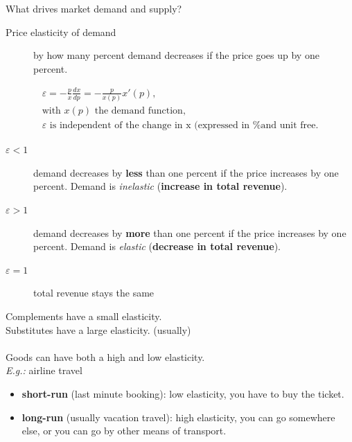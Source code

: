 \documentclass[12pt, a4paper, titlepage]{extarticle}
\begin{document}
	What drives market demand and supply?
	
	\begin{description}
		\item[Price elasticity of demand] by how many percent demand decreases if the price goes up by one percent. 
	\end{description}
	
	\begin{equation}
		\begin{gathered}
			\varepsilon = -\frac{p}{x}\frac{dx}{dp} = -\frac{p}{x(p)}x'(p), \\ \text{with $x(p)$ the demand function,} \\ \text{$\varepsilon$ is independent of the change in x (expressed in \% and unit free.}
		\end{gathered}
	\end{equation}
	
	\begin{description}
		\item[$\varepsilon < 1$] demand decreases by \textbf{less} than one percent if the price increases by one percent. Demand is \textit{inelastic} (\textbf{increase in total revenue}). 
		\item[$\varepsilon > 1$] demand decreases by \textbf{more} than one percent if the price increases by one percent. Demand is \textit{elastic} (\textbf{decrease in total revenue}).
		\item[$\varepsilon = 1$] total revenue stays the same 
	\end{description}
	Complements have a small elasticity.\\
	Substitutes have a large elasticity. (usually)\\
	\\
	Goods can have both a high and low elasticity.\\
	\textit{E.g.:} airline travel
	
	\begin{itemize}
		\item \textbf{short-run} (last minute booking): low elasticity, you have to buy the ticket.
		\item \textbf{long-run} (usually vacation travel): high elasticity, you can go somewhere else, or you can go by other means of transport. 
	\end{itemize}
	
\end{document}
